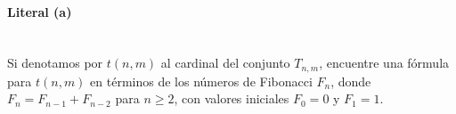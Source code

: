 \paragraph{Literal (a)}\mbox{}\\
Si denotamos por \(t(n,m)\) al cardinal del conjunto \(T_{n,m}\), encuentre una fórmula para \(t(n,m)\) en términos de los números de Fibonacci \(F_n\), donde \(F_n=F_{n-1}+F_{n-2}\) para \(n\ge2\), con valores iniciales \(F_0=0\) y \(F_1=1\).